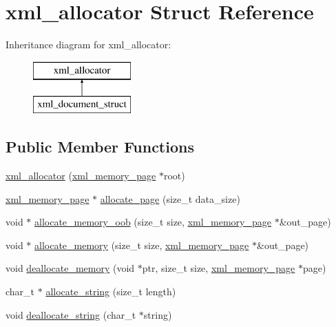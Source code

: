 \hypertarget{structxml__allocator}{\section{xml\-\_\-allocator Struct Reference}
\label{structxml__allocator}
}
Inheritance diagram for xml\-\_\-allocator\-:\begin{figure}[H]
\begin{center}
\leavevmode
\includegraphics[height=2.000000cm]{structxml__allocator}
\end{center}
\end{figure}
\subsection*{Public Member Functions}
\begin{DoxyCompactItemize}
\item 
\hyperlink{structxml__allocator_ad41b1a18595953aa71a470b45921c0fd}{xml\-\_\-allocator} (\hyperlink{structxml__memory__page}{xml\-\_\-memory\-\_\-page} $\ast$root)
\item 
\hyperlink{structxml__memory__page}{xml\-\_\-memory\-\_\-page} $\ast$ \hyperlink{structxml__allocator_a4b399b01e530220ec5849b912b84063b}{allocate\-\_\-page} (size\-\_\-t data\-\_\-size)
\item 
void $\ast$ \hyperlink{structxml__allocator_a30bb557bc040de54c041c6d3dca6772e}{allocate\-\_\-memory\-\_\-oob} (size\-\_\-t size, \hyperlink{structxml__memory__page}{xml\-\_\-memory\-\_\-page} $\ast$\&out\-\_\-page)
\item 
void $\ast$ \hyperlink{structxml__allocator_afac0b9fac2c2962972f60d0346eb4f39}{allocate\-\_\-memory} (size\-\_\-t size, \hyperlink{structxml__memory__page}{xml\-\_\-memory\-\_\-page} $\ast$\&out\-\_\-page)
\item 
void \hyperlink{structxml__allocator_a5df417155487cce4e0460b123ac33dc6}{deallocate\-\_\-memory} (void $\ast$ptr, size\-\_\-t size, \hyperlink{structxml__memory__page}{xml\-\_\-memory\-\_\-page} $\ast$page)
\item 
char\-\_\-t $\ast$ \hyperlink{structxml__allocator_ac5ec2b5d41672d6494a2742e95e525b3}{allocate\-\_\-string} (size\-\_\-t length)
\item 
void \hyperlink{structxml__allocator_af32c538db4d562c2d0bfe15f7c0aa879}{deallocate\-\_\-string} (char\-\_\-t $\ast$string)
\end{DoxyCompactItemize}
